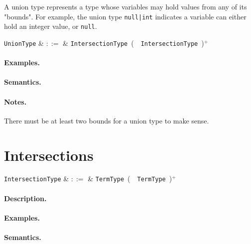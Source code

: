 A union type represents a type whose variables may hold values from any of its "bounds". For example, the union type \lstinline{null|int} indicates a variable can either hold an integer value, or \lstinline{null}. 

\begin{syntax}
  \verb+UnionType+ & $::=$ & \verb+IntersectionType+\ \big(\ \token{|}\ \verb+IntersectionType+\
  \big)$^+$\\
\end{syntax}

\paragraph{Examples.}

\paragraph{Semantics.}

\paragraph{Notes.}  There must be at least two bounds for a union type to make sense.


\section{Intersections}

\begin{syntax}
  \verb+IntersectionType+ & $::=$ & \verb+TermType+\ \big(\ \token{\&}\ \verb+TermType+\
  \big)$^+$\\
\end{syntax}

\paragraph{Description.}

\paragraph{Examples.}

\paragraph{Semantics.}

